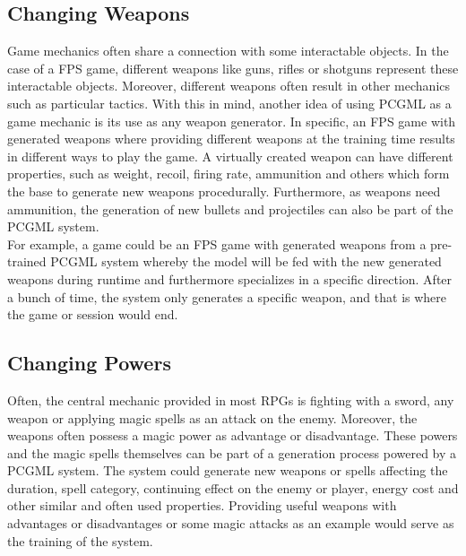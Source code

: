 \documentclass[MGS,Master,english]{twbook}%
\begin{document}
\subsection{Changing Weapons} \label{idea::changingWeapons}
Game mechanics often share a connection with some interactable objects. In the case of a \ac{FPS} game, different weapons like guns, rifles or shotguns represent these interactable objects. Moreover, different weapons often result in other mechanics such as particular tactics. With this in mind, another idea of using PCGML as a game mechanic is its use as any weapon generator. In specific, an FPS game with generated weapons where providing different weapons at the training time results in different ways to play the game. A virtually created weapon can have different properties, such as weight, recoil, firing rate, ammunition and others which form the base to generate new weapons procedurally. Furthermore, as weapons need ammunition, the generation of new bullets and projectiles can also be part of the PCGML system. \\
For example, a game could be an FPS game with generated weapons from a pre-trained PCGML system whereby the model will be fed with the new generated weapons during runtime and furthermore specializes in a specific direction. After a bunch of time, the system only generates a specific weapon, and that is where the game or session would end.

\subsection{Changing Powers} \label{idea::changingPowers}
Often, the central mechanic provided in most \acp{RPG} is fighting with a sword, any weapon or applying magic spells as an attack on the enemy. Moreover, the weapons often possess a magic power as advantage or disadvantage. These powers and the magic spells themselves can be part of a generation process powered by a PCGML system. The system could generate new weapons or spells affecting the duration, spell category, continuing effect on the enemy or player, energy cost and other similar and often used properties. Providing useful weapons with advantages or disadvantages or some magic attacks as an example would serve as the training of the system.
\end{document}

